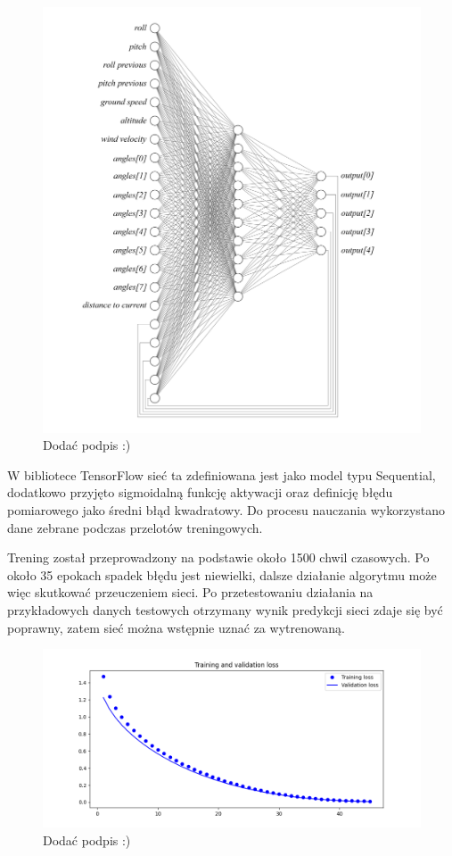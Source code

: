\documentclass[12pt, a4paper]{article}
\begin{document}
 \begin{figure}[H]
    \centering
    \includegraphics[width=1\textwidth]{siec}
    \caption{Dodać podpis :)}
\end{figure}

W bibliotece TensorFlow sieć ta zdefiniowana jest jako model typu Sequential, dodatkowo przyjęto sigmoidalną funkcję aktywacji oraz definicję błędu pomiarowego jako średni błąd kwadratowy. Do procesu nauczania wykorzystano dane zebrane podczas przelotów treningowych.


Trening został przeprowadzony na podstawie około 1500 chwil czasowych. Po około 35 epokach spadek błędu jest niewielki, dalsze działanie algorytmu może więc skutkować przeuczeniem sieci. Po przetestowaniu działania na przykładowych danych testowych otrzymany wynik predykcji sieci zdaje się być poprawny, zatem sieć można wstępnie uznać za wytrenowaną.

 \begin{figure}[H]
    \centering
    \includegraphics[width=1\textwidth]{tfloss}
    \caption{Dodać podpis :)}
\end{figure}
\end{document}
